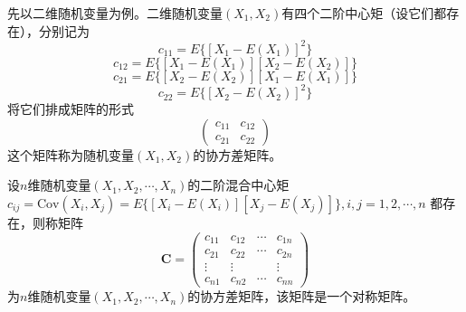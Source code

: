 \begin{definition}[协方差矩阵]
    先以二维随机变量为例。二维随机变量$(X_1,X_2)$有四个二阶中心矩（设它们都存在），分别记为
    $$c_{11}=E\{{[X_1-E(X_1)]}^2\}$$
    $$c_{12}=E\{[X_1-E(X_1)][X_2-E(X_2)]\}$$
    $$c_{21}=E\{[X_2-E(X_2)][X_1-E(X_1)]\}$$
    $$c_{22}=E\{{[X_2-E(X_2)]}^2\}$$
    将它们排成矩阵的形式
    $$\left(\begin{array}{ll}
        c_{11} & c_{12} \\
        c_{21} & c_{22}
        \end{array}\right)$$
    这个矩阵称为随机变量$(X_1,X_2)$的{\heiti 协方差矩阵}。

    设$n$维随机变量$(X_1,X_2,\cdots,X_n)$的二阶混合中心矩$c_{ij}=\mathrm{Cov}(X_i,X_j)=E\{[X_i-E(X_i)][X_j-E(X_j)]\},i,j=1,2,\cdots,n$
    都存在，则称矩阵
    $$\boldsymbol{C}=\left(\begin{array}{llll}
        c_{11} & c_{12} & \cdots & c_{1n}\\
        c_{21} & c_{22} & \cdots & c_{2n}\\
        \vdots & \vdots &        & \vdots \\
        c_{n1} & c_{n2} & \cdots & c_{nn}
        \end{array}\right)$$
    为$n$维随机变量$(X_1,X_2,\cdots,X_n)$的{\heiti 协方差矩阵}，该矩阵是一个对称矩阵。
\end{definition}

